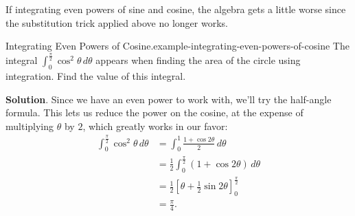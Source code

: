 \documentclass[10pt,]{book}
\numberwithin{equation}{section}
\begin{document}
\hypertarget{p-528}{}%
If integrating even powers of sine and cosine, the algebra gets a little worse since the substitution trick applied above no longer works.%
\begin{example}{Integrating Even Powers of Cosine.}{example-integrating-even-powers-of-cosine}%
\hypertarget{p-529}{}%
The integral \(\int_{0}^{\frac{\pi}{2}}\cos^{2}\theta\,d\theta\) appears when finding the area of the circle using integration. Find the value of this integral.%
\par\smallskip%
\noindent\textbf{Solution}.\hypertarget{solution-116}{}\quad%
\hypertarget{p-530}{}%
Since we have an even power to work with, we'll try the half-angle formula. This lets us reduce the power on the cosine, at the expense of multiplying \(\theta\) by \(2\), which greatly works in our favor:%
%
\begin{align*}
\int_{0}^{\frac{\pi}{2}}\cos^{2}\theta\,d\theta & =\int_{0}^{1}\frac{1 + \cos2\theta}{2}\,d\theta \\
& = \frac{1}{2}\int_{0}^{\frac{\pi}{2}}(1 + \cos2\theta)\,d\theta \\
& = \frac{1}{2}\left[\theta + \frac{1}{2}\sin2\theta\right]_{0}^{\frac{\pi}{2}} \\
& = \frac{\pi}{4}. 
\end{align*}
\end{example}
%
%
\typeout{************************************************}
\typeout{************************************************}
%
\end{document}
